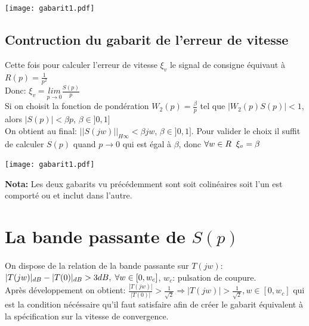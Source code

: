 \documentclass[12pt, a4paper, openany]{report}
\begin{document}
   \begin{center}
    \texttt{[image: gabarit1.pdf]}
    \label{fig4}
  \end{center}
   
  \subsection{Contruction du gabarit de l'erreur de vitesse}
  
  Cette fois pour calculer l'erreur de vitesse $\xi_{v}$ le signal de consigne équivaut à $R(p)=\frac{1}{p^{2}}$\\[0.75cm]
  Donc: \hspace{5mm} $\xi_{v}=\underset{p\longrightarrow 0}{lim}\frac{S(p)}{p}$\\[0.75cm]
  Si on choisit la fonction de pondération $W_{2}(p)=\frac{\beta}{p}$ tel que $|W_{2}(p)S(p)|<1$, alors $|S(p)|<\beta p$, $\beta \in ]0, 1]$\\[0.75cm]
  On obtient au final: \hspace{5mm} $||S(jw)||_{H\infty}<\beta jw$, $\beta \in ]0, 1]$. Pour valider le choix il suffit de calculer $S(p)$ quand $p\rightarrow0$ qui est égal à $\beta$, donc $\forall w \in R \hspace{2mm} \xi_{v}=\beta$ 
  
  \begin{center}
    \texttt{[image: gabarit1.pdf]}
    \label{fig5}
  \end{center}
  
 \textbf{Nota:} \hspace{2mm} Les deux gabarits vu précédemment sont soit colinéaires soit l'un est comporté ou et inclut dans l'autre.\\
 

 \section{La bande passante de $S(p)$}
 
 \paragraph{}
 On dispose de la relation de la bande passante sur $T(jw)$: $|T(jw)|_{dB}-|T(0)|_{dB}>3dB,\hspace{1mm} \forall w\in[0, w_{c}]$, $w_{c}$: pulsation de coupure.\\
 Après développement on obtient: $\frac{|T(jw)|}{|T(0)|}>\frac{1}{\sqrt{2}} \Rightarrow |T(jw)|>\frac{1}{\sqrt{2}}, w\in[0, w_{c}]$ qui est la condition nécéssaire qu'il faut satisfaire afin de créer le gabarit équivalent à la spécification sur la vitesse de convergence.\\
 
\end{document}
